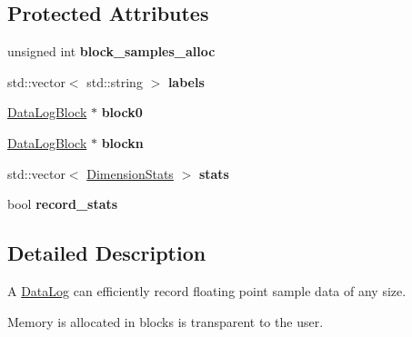 \subsection*{Protected Attributes}
\begin{DoxyCompactItemize}
\item 
unsigned int {\bfseries block\+\_\+samples\+\_\+alloc}\hypertarget{classpangolin_1_1_data_log_a990a2d63bd18bd4c4cdf96cc8a4602ba}{}\label{classpangolin_1_1_data_log_a990a2d63bd18bd4c4cdf96cc8a4602ba}

\item 
std\+::vector$<$ std\+::string $>$ {\bfseries labels}\hypertarget{classpangolin_1_1_data_log_a17b9968806d9251ddd6cbf204e9ca4c0}{}\label{classpangolin_1_1_data_log_a17b9968806d9251ddd6cbf204e9ca4c0}

\item 
\hyperlink{classpangolin_1_1_data_log_block}{Data\+Log\+Block} $\ast$ {\bfseries block0}\hypertarget{classpangolin_1_1_data_log_a618cec617dc2b8405729abb7889c3179}{}\label{classpangolin_1_1_data_log_a618cec617dc2b8405729abb7889c3179}

\item 
\hyperlink{classpangolin_1_1_data_log_block}{Data\+Log\+Block} $\ast$ {\bfseries blockn}\hypertarget{classpangolin_1_1_data_log_ad8ab0338adf86fc912d6211a3502155d}{}\label{classpangolin_1_1_data_log_ad8ab0338adf86fc912d6211a3502155d}

\item 
std\+::vector$<$ \hyperlink{structpangolin_1_1_dimension_stats}{Dimension\+Stats} $>$ {\bfseries stats}\hypertarget{classpangolin_1_1_data_log_a0b31a1be6ccba4ecb465e48a2cf18fef}{}\label{classpangolin_1_1_data_log_a0b31a1be6ccba4ecb465e48a2cf18fef}

\item 
bool {\bfseries record\+\_\+stats}\hypertarget{classpangolin_1_1_data_log_a989503f87d8b8e452d517c1ec7b7ab8f}{}\label{classpangolin_1_1_data_log_a989503f87d8b8e452d517c1ec7b7ab8f}

\end{DoxyCompactItemize}


\subsection{Detailed Description}
A \hyperlink{classpangolin_1_1_data_log}{Data\+Log} can efficiently record floating point sample data of any size. 

Memory is allocated in blocks is transparent to the user. 

